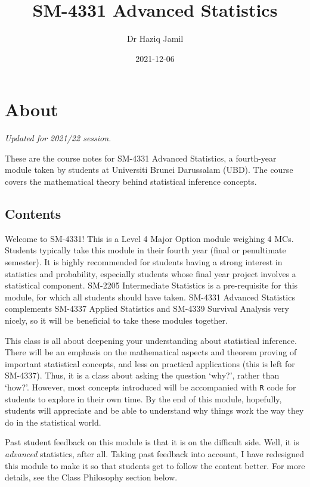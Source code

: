 \documentclass[
]{book}
\title{SM-4331 Advanced Statistics}
\author{Dr Haziq Jamil}
\date{2021-12-06}
\theoremstyle{definition}
\theoremstyle{definition}
\theoremstyle{definition}
\theoremstyle{definition}
\theoremstyle{remark}
\begin{document}
\maketitle

{
\setcounter{tocdepth}{1}
\tableofcontents
}
\hypertarget{about}{%
\chapter*{About}\label{about}}

\emph{Updated for 2021/22 session.}

These are the course notes for SM-4331 Advanced Statistics, a fourth-year module taken by students at Universiti Brunei Darussalam (UBD).
The course covers the mathematical theory behind statistical inference concepts.

\hypertarget{contents}{%
\section*{Contents}\label{contents}}

Welcome to SM-4331!
This is a Level 4 Major Option module weighing 4 MCs.
Students typically take this module in their fourth year (final or penultimate semester).
It is highly recommended for students having a strong interest in statistics and probability, especially students whose final year project involves a statistical component.
SM-2205 Intermediate Statistics is a pre-requisite for this module, for which all students should have taken.
SM-4331 Advanced Statistics complements SM-4337 Applied Statistics and SM-4339 Survival Analysis very nicely, so it will be beneficial to take these modules together.

This class is all about deepening your understanding about statistical inference.
There will be an emphasis on the mathematical aspects and theorem proving of important statistical concepts, and less on practical applications (this is left for SM-4337).
Thus, it is a class about asking the question `why?', rather than `how?'.
However, most concepts introduced will be accompanied with \texttt{R} code for students to explore in their own time.
By the end of this module, hopefully, students will appreciate and be able to understand why things work the way they do in the statistical world.

Past student feedback on this module is that it is on the difficult side.
Well, it is \emph{advanced} statistics, after all.
Taking past feedback into account, I have redesigned this module to make it so that students get to follow the content better.
For more details, see the Class Philosophy section below.
\end{document}
